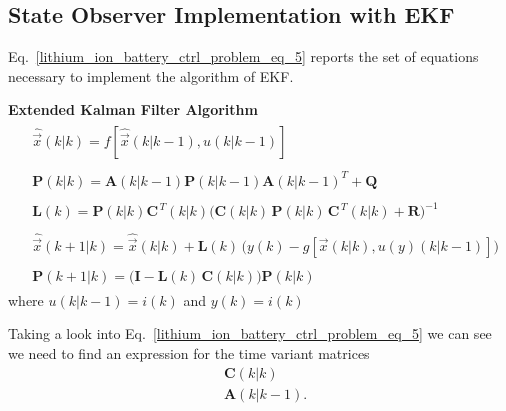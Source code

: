 \documentclass[11pt,a4paper,oneside]{book}
\numberwithin{equation}{section}
\theoremstyle{it}
\theoremstyle{definition}
\begin{document}
\subsection{State Observer Implementation with EKF}
Eq.~\eqref{lithium_ion_battery_ctrl_problem_eq_5} reports the set of equations necessary to implement the algorithm of EKF. 
\begin{mybox}
	\noindent\textbf{Extended Kalman Filter Algorithm}
	\begin{align}\label{lithium_ion_battery_ctrl_problem_eq_5}
		\begin{split}
			&\hat{\vec{x}}\left(k|k\right) 
			=f[\hat{\vec{x}}\left(k|k-1\right),{u}\left(k|k-1\right)]
		\end{split} \\[8pt]
		\begin{split}
			&\mathbf{P}\left(k|k\right) = 
			\mathbf{A}(k|k-1)\mathbf{P}\left(k|k-1\right) \mathbf{A}(k|k-1)^T + 
			\mathbf{Q} 
		\end{split}\\[8pt]
		\begin{split}
			&\mathbf{L}(k) = \mathbf{P}(k|k)\mathbf{C}^{\,T}(k|k) 
			\Big(\mathbf{C}(k|k)\,\mathbf{P}(k|k)\,\mathbf{C}^{\,T}(k|k) 
			+\mathbf{R}\Big)^{-1}
		\end{split}\\[8pt]
		\begin{split}
			&\hat{\vec{x}}\left(k+1|k\right) = \hat{\vec{x}}\left(k|k\right) + 
			\mathbf{L}(k)\, \Big({y}(k) - 
			g[\vec{x}(k|k),u(y)\left(k|k-1\right)]\Big)
		\end{split}\\[8pt]
		\begin{split}
			&\mathbf{P}\left(k+1|k\right) = 
			\Big(\mathbf{I}-\mathbf{L}(k)\,\mathbf{C}(k|k) \Big) 
			\mathbf{P}\left(k|k\right) 
		\end{split}
	\end{align}
	where $u(k|k-1)=i(k)$ and $y(k)=i(k)$
\end{mybox} 
Taking a look into Eq.~\eqref{lithium_ion_battery_ctrl_problem_eq_5} we can see we need to find an expression for the time variant matrices
\begin{equation}\label{lithium_ion_battery_ctrl_problem_eq_4a}
	\begin{aligned}
		&\mathbf{C}(k|k) \\[6pt]
		&\mathbf{A}(k|k-1).
	\end{aligned}
\end{equation}
\end{document}
